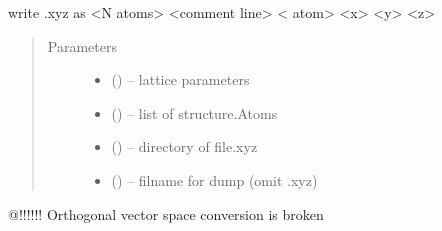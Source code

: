 \documentclass[letterpaper,10pt,english]{sphinxmanual}
\begin{document}

\begin{fulllineitems}
\label{\detokenize{rst/supercell:mstack.supercell.pub_xyz}}
write .xyz as
\textless{}N atoms\textgreater{}
\textless{}comment line\textgreater{}
\textless{} atom\textgreater{} \textless{}x\textgreater{} \textless{}y\textgreater{} \textless{}z\textgreater{}
\begin{quote}\begin{description}
\item[{Parameters}] \leavevmode\begin{itemize}
\item {} 
\sphinxstyleliteralstrong{, }\sphinxstyleliteralstrong{, } (\sphinxstyleliteralemphasis{,}\sphinxstyleliteralemphasis{}) -- lattice parameters

\item {} 
 () -- list of structure.Atoms

\item {} 
 () -- directory of file.xyz

\item {} 
 () -- filname for dump (omit .xyz)

\end{itemize}

\end{description}\end{quote}

@!!!!!! Orthogonal vector space conversion is broken

\end{fulllineitems}

\end{document}
